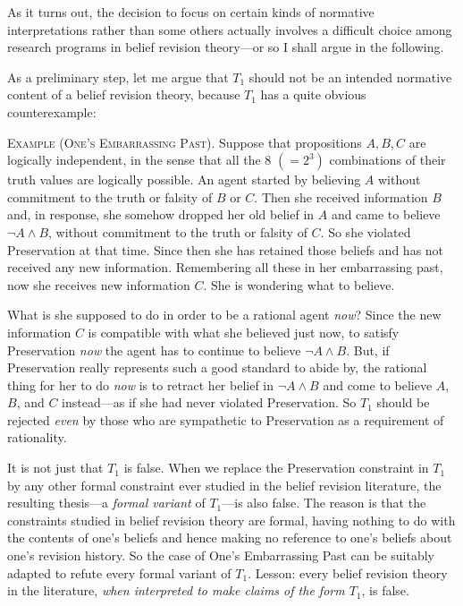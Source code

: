 As it turns out, the decision to focus on certain kinds of normative interpretations rather than some others actually involves a difficult choice among research programs in belief revision theory---or so I shall argue in the following. 

As a preliminary step, let me argue that $T_1$ should not be an intended normative content of a belief revision theory, because $T_1$ has a quite obvious counterexample: \op

	\xm \textsc{Example (One's Embarrassing Past).} Suppose that propositions $A, B, C$ are logically independent, in the sense that all the $8$ $(= 2^3)$ combinations of their truth values are logically possible. An agent started by believing $A$ without commitment to the truth or falsity of $B$ or $C$. Then she received information $B$ and, in response, she somehow dropped her old belief in $A$ and came to believe $\neg A \wedge B$, without commitment to the truth or falsity of $C$. So she violated Preservation at that time. Since then she has retained those beliefs and has not received any new information. Remembering all these in her embarrassing past, now she receives new information $C$. She is wondering what to believe.

\ed What is she supposed to do in order to be a rational agent {\em now}? Since the new information $C$ is compatible with what she believed just now, to satisfy Preservation {\em now} the agent has to continue to believe $\neg A \wedge B$. But, if Preservation really represents such a good standard to abide by, the rational thing for her to do {\em now} is to retract her belief in $\neg A \wedge B$ and come to believe $A$, $B$, and $C$ instead---as if she had never violated Preservation. So $T_1$ should be rejected {\em even} by those who are sympathetic to Preservation as a requirement of rationality. 

It is not just that $T_1$ is false. When we replace the Preservation constraint in $T_1$ by any other formal constraint ever studied in the belief revision literature, the resulting thesis---a {\em formal variant} of $T_1$---is also false. The reason is that the constraints studied in belief revision theory are formal, having nothing to do with the contents of one's beliefs and hence making no reference to one's beliefs about one's revision history. So the case of One's Embarrassing Past can be suitably adapted to refute every formal variant of $T_1$. Lesson: every belief revision theory in the literature, {\em when interpreted to make claims of the form $T_1$}, is false. 


